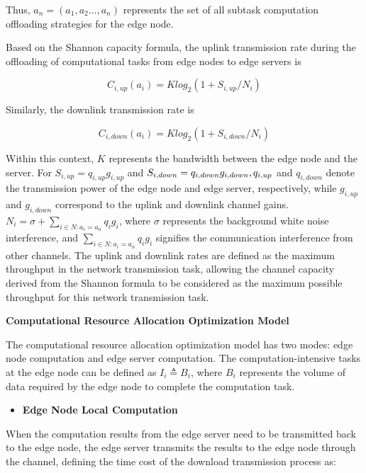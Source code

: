 \documentclass[preprint,12pt,authoryear]{elsarticle}
\begin{document}
Thus, \(a_n=(a_1,a_2...,a_n)\) represents the set of all subtask computation offloading strategies for the edge node.

Based on the Shannon capacity formula, the uplink transmission rate during the offloading of computational tasks from edge nodes to edge servers is

\begin{equation}
    C_{i,up}(a_i)=Klog_2(1+S_{i,up}/N_i)
\end{equation}

Similarly, the downlink transmission rate is

\begin{equation}
    C_{i,down}(a_i)=Klog_2(1+S_{i,down}/N_i)
\end{equation}

Within this context, \(K\) represents the bandwidth between the edge node and the server. For \(S_{i, up}=q_{i, up}g_{i, up}\) and \( S_{i, down}=q_{i, down} g_{i, down}, q_{i\\, up}\) and \(q_{i, down}\)  denote the transmission power of the edge node and edge server, respectively, while \(g_{i, up}\) and \(g_{i, down}\) correspond to the uplink and downlink channel gains. \(N_i=\sigma+\sum_{i\in{N}:a_i=a_n}q_i g_i\), where  \(\sigma\) represents the background white noise interference, and  \(\sum_{i\in{N}:a_i=a_n}q_i g_i\) signifies the communication interference from other channels. The uplink and downlink rates are defined as the maximum throughput in the network transmission task, allowing the channel capacity derived from the Shannon formula to be considered as the maximum possible throughput for this network transmission task.

\textbf{Computational Resource Allocation Optimization Model}

The computational resource allocation optimization model has two modes: edge node computation and edge server computation. The computation-intensive tasks at the edge node can be defined as \(I_i \triangleq B_i\), where \(B_i\) represents the volume of data required by the edge node to complete the computation task.

\begin{itemize}
    \item {\fontsize{11}{\baselineskip}\selectfont \textbf{Edge Node Local Computation}}
\end{itemize}

When the computation results from the edge server need to be transmitted back to the edge node, the edge server transmits the results to the edge node through the channel, defining the time cost of the download transmission process as:
\end{document}

